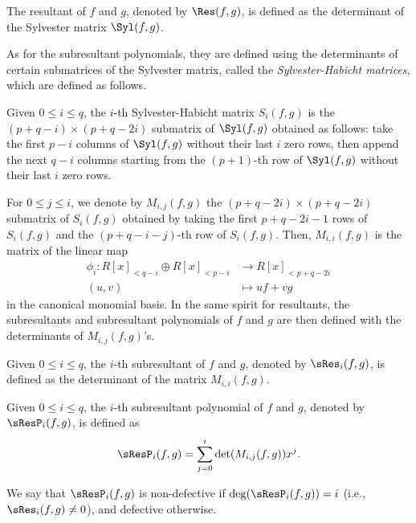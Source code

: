 \begin{definition}[Resultant]
    The resultant of $f$ and $g$, denoted by $\Res(f,g)$, is defined as the determinant of the Sylvester matrix $\Syl(f,g)$.
\end{definition}

As for the subresultant polynomials, they are defined using the determinants of certain submatrices of the Sylvester matrix, called the \emph{Sylvester-Habicht matrices}, which are defined as follows.

\begin{definition}
    Given $0\leq i\leq q$, the $i$-th Sylvester-Habicht matrix $S_i(f,g)$ is the $(p+q-i)\times(p+q-2i)$ submatrix of $\Syl(f,g)$ obtained as follows: take the first $p-i$ columns of $\Syl(f,g)$ without their last $i$ zero rows, then append the next $q-i$ columns starting from the $(p+1)$-th row of $\Syl(f,g)$ without their last $i$ zero rows.
\end{definition}

For $0\leq j\leq i$, we denote by $M_{i,j}(f,g)$ the $(p+q-2i)\times(p+q-2i)$ submatrix of $S_i(f,g)$ obtained by taking the first $p+q-2i-1$ rows of $S_i(f,g)$ and the $(p+q-i-j)$-th row of $S_i(f,g)$. Then, $M_{i,i}(f,g)$ is the matrix of the linear map
\begin{align*}
    \phi_i : R[x]_{<q-i} \oplus R[x]_{<p-i} & \to R[x]_{<p+q-2i} \\
    (u,v)                                   & \mapsto uf + vg
\end{align*}
in the canonical monomial basis. In the same spirit for resultants, the subresultants and subresultant polynomials of $f$ and $g$ are then defined with the determinants of $M_{i,j}(f,g)$'s.

\begin{definition}[Subresultant]
    Given $0\leq i\leq q$, the $i$-th subresultant of $f$ and $g$, denoted by $\sRes_i(f,g)$, is defined as the determinant of the matrix $M_{i,i}(f,g)$.
\end{definition}

\begin{definition}
    Given $0\leq i\leq q$, the $i$-th subresultant polynomial of $f$ and $g$, denoted by $\sResP_i(f,g)$, is defined as
    \begin{equation*}
        \sResP_i(f,g) = \sum_{j=0}^i \det(M_{i,j}(f,g)) x^j.
    \end{equation*}

    We say that $\sResP_i(f,g)$ is non-defective if $\deg(\sResP_i(f,g))=i$ (i.e., $\sRes_i(f,g)\neq 0$), and defective otherwise.
\end{definition}

